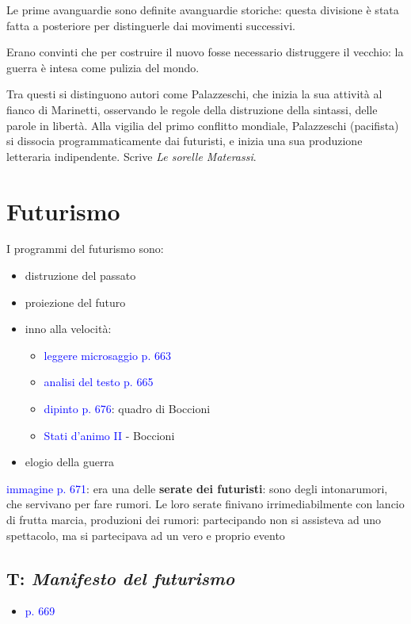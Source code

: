 \documentclass[a4paper, twoside, titlepage]{book}
\newcounter{mar}
\newcommand{\elenco}[1]{%
\begin{itemize}
#1
\end{itemize}}
\renewcommand{\emph}[1]{\textcolor{blue}{#1}}
\begin{document}
Le prime avanguardie sono definite avanguardie storiche: questa divisione è stata fatta a posteriore per distinguerle dai movimenti successivi.

Erano convinti che per costruire il nuovo fosse necessario distruggere il vecchio: la guerra è intesa come pulizia del mondo.

Tra questi si distinguono autori come Palazzeschi, che inizia la sua attività al fianco di Marinetti, osservando le regole della distruzione della sintassi, delle parole in libertà.
Alla vigilia del primo conflitto mondiale, Palazzeschi (pacifista) si dissocia programmaticamente dai futuristi, e inizia una sua produzione letteraria indipendente. Scrive \textit{Le sorelle Materassi}.

\section{Futurismo}

I programmi del futurismo sono:

\elenco{
	\item distruzione del passato
	\item proiezione del futuro
	\item inno alla velocità:
	\elenco{
		\item \emph{leggere microsaggio p. 663}
		\item \emph{analisi del testo p. 665}
		\item \emph{dipinto p. 676}: quadro di Boccioni
		\item \emph{Stati d’animo II} - Boccioni}
	\item elogio della guerra}

\emph{immagine p. 671}: era una delle \textbf{serate dei futuristi}: sono degli intonarumori, che servivano per fare rumori. 
Le loro serate finivano irrimediabilmente con lancio di frutta marcia, produzioni dei rumori: partecipando non si assisteva ad uno spettacolo, ma si partecipava ad un vero e proprio evento

\subsection{T: \textit{Manifesto del futurismo}}
	\elenco{\item \emph{p. 669}}
\end{document}
